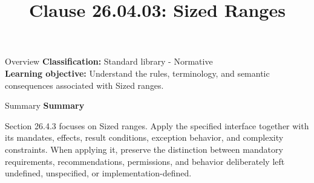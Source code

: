 \documentclass[10pt,letterpaper]{article}
\title{Clause 26.04.03: Sized Ranges}
\author{}
\date{}
\begin{document}
\maketitle
\begin{CornellOverviewBox}{Overview}
\textbf{Classification:} Standard library - Normative\\[2pt]
\textbf{Learning objective:} Understand the rules, terminology, and semantic consequences associated with Sized ranges.
\end{CornellOverviewBox}\begin{CornellSummaryBox}{Summary}
{\sffamily\bfseries\color{Accent} Summary}\par\vspace{3pt}Section 26.4.3 focuses on Sized ranges. Apply the specified interface together with its mandates, effects, result conditions, exception behavior, and complexity constraints. When applying it, preserve the distinction between mandatory requirements, recommendations, permissions, and behavior deliberately left undefined, unspecified, or implementation-defined.
\end{CornellSummaryBox}
\end{document}
